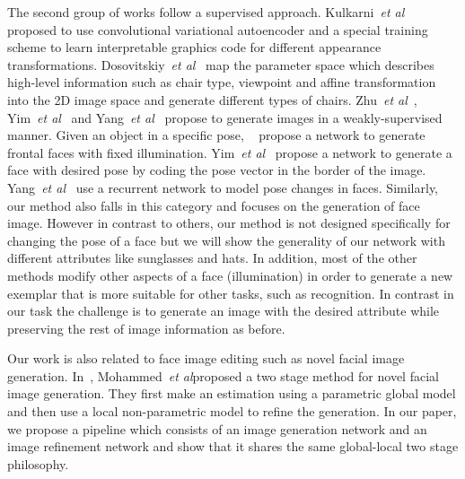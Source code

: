 \documentclass[10pt,twocolumn,letterpaper]{article}
\def\etal{\emph{et al}\onedot}
\begin{document}
The second group of works follow a supervised approach.
Kulkarni~\etal~\cite{Kulkarni-nips15} proposed to use convolutional variational autoencoder and a special training scheme to learn interpretable graphics code for different appearance transformations.
Dosovitskiy~\etal~\cite{Dosovitskiy-cvpr15} map the parameter space which describes high-level information
such as chair type, viewpoint and affine transformation into the 2D image space and generate different types of chairs.
Zhu~\etal~\cite{zhu2013deep,zhu-nips14}, Yim~\etal~\cite{Yim-cvpr15} and Yang~\etal~\cite{Yang-nips15}
propose to generate images in a weakly-supervised manner.
Given an object in a specific pose, ~\cite{zhu2013deep} propose a network to generate frontal faces with fixed illumination.
Yim~\etal~\cite{Yim-cvpr15} propose a network to generate a face with desired pose by coding the pose vector in the border of the image.
Yang~\etal~\cite{Yang-nips15} use a recurrent network to model pose changes in faces.
Similarly, our method also falls in this category and focuses on the generation of face image. However in contrast to others, our method is not designed specifically for changing the pose of a face but we will show the generality of our network with different attributes like sunglasses and hats. In addition, most of the other methods modify other aspects of a face (\eg illumination) in order to generate a new exemplar that is more suitable for other tasks, such as recognition. In contrast in our task the challenge is to generate an image with the desired attribute while preserving the rest of image information as before.

Our work is also related to face image editing such as novel facial image generation.
In~\cite{Mohammed-siggraph09}, Mohammed~\etal proposed a two stage method for novel facial image generation.
They first make an estimation using a parametric global model and then use a local non-parametric model to refine the generation.
In our paper, we propose a pipeline which consists of an image generation network and an image refinement network
and show that it shares the same global-local two stage philosophy.



\vspace{-1mm}
\end{document}
